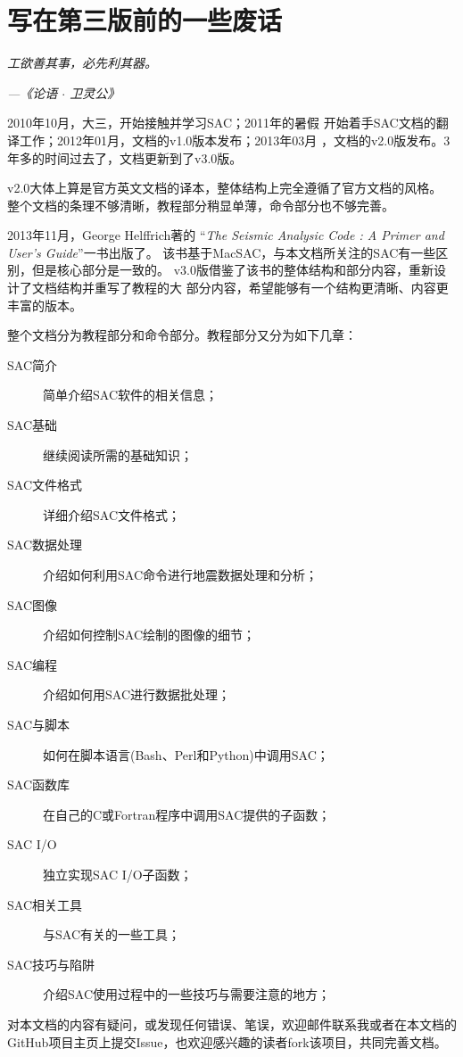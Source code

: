 \section*{\centering 写在第三版前的一些废话}

\begin{shadequote*}
\Large\emph{
工欲善其事，必先利其器。
}
\par\hfill\emph{\normalsize---《论语 $\cdot$ 卫灵公》}
\end{shadequote*}

2010年10月，大三，开始接触并学习SAC；2011年的暑假
开始着手SAC文档的翻译工作；2012年01月，文档的v1.0版本发布；2013年03月
，文档的v2.0版发布。3年多的时间过去了，文档更新到了v3.0版。

v2.0大体上算是官方英文文档的译本，整体结构上完全遵循了官方文档的风格。
整个文档的条理不够清晰，教程部分稍显单薄，命令部分也不够完善。

2013年11月，George Helffrich著的
``\emph{The Seismic Analysic Code : A Primer and User's Guide}''一书出版了。
该书基于MacSAC，与本文档所关注的SAC有一些区别，但是核心部分是一致的。
v3.0版借鉴了该书的整体结构和部分内容，重新设计了文档结构并重写了教程的大
部分内容，希望能够有一个结构更清晰、内容更丰富的版本。

整个文档分为教程部分和命令部分。教程部分又分为如下几章：
\begin{description}
\item[SAC简介] 简单介绍SAC软件的相关信息；
\item[SAC基础] 继续阅读所需的基础知识；
\item[SAC文件格式] 详细介绍SAC文件格式；
\item[SAC数据处理] 介绍如何利用SAC命令进行地震数据处理和分析；
\item[SAC图像] 介绍如何控制SAC绘制的图像的细节；
\item[SAC编程] 介绍如何用SAC进行数据批处理；
\item[SAC与脚本] 如何在脚本语言(Bash、Perl和Python)中调用SAC；
\item[SAC函数库] 在自己的C或Fortran程序中调用SAC提供的子函数；
\item[SAC I/O] 独立实现SAC I/O子函数；
\item[SAC相关工具] 与SAC有关的一些工具；
\item[SAC技巧与陷阱] 介绍SAC使用过程中的一些技巧与需要注意的地方；
\end{description}

对本文档的内容有疑问，或发现任何错误、笔误，欢迎邮件联系我或者在本文档的
GitHub项目主页上提交Issue，也欢迎感兴趣的读者fork该项目，共同完善文档。

